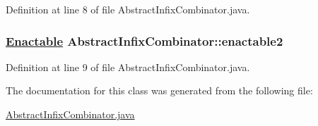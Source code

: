 Definition at line 8 of file Abstract\-Infix\-Combinator.java.\hypertarget{classAbstractInfixCombinator_o1}{
\subsubsection[enactable2]{\setlength{\rightskip}{0pt plus 5cm}\hyperlink{interfaceEnactable}{Enactable} Abstract\-Infix\-Combinator::enactable2}}
\label{classAbstractInfixCombinator_o1}




Definition at line 9 of file Abstract\-Infix\-Combinator.java.

The documentation for this class was generated from the following file:\begin{CompactItemize}
\item 
\hyperlink{AbstractInfixCombinator_8java-source}{Abstract\-Infix\-Combinator.java}\end{CompactItemize}
